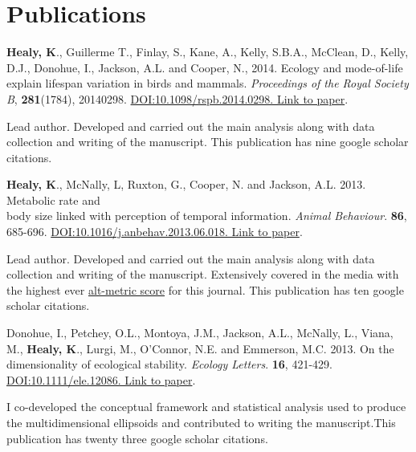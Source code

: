 \documentclass[10pt,a4paper]{article}
\begin{document}
\section{Publications}
\begin{flushleft}
\textbf{Healy, K}., Guillerme T., Finlay, S., Kane, A., Kelly, S.B.A., McClean, D., Kelly, D.J., Donohue, I., Jackson, A.L. and Cooper, N., 2014. Ecology and mode-of-life explain lifespan variation in birds and mammals. \textit{Proceedings of the Royal Society B}, \textbf{281}(1784), 20140298. \href{http://rspb.royalsocietypublishing.org/content/281/1784/20140298}{DOI:10.1098/rspb.2014.0298. Link to paper}.
\smallskip
\par{\fontsize{10.5}{10} Lead author. Developed and carried out the main analysis along with data collection and writing of the manuscript. This publication has nine google scholar citations.}

\bigskip

\textbf{Healy, K}., McNally, L, Ruxton, G., Cooper, N. and Jackson, A.L. 2013. Metabolic rate and\\
body size linked with perception of temporal information.  \textit{Animal Behaviour}. \textbf{86}, 685-696. \href{http://dx.doi.org/10.1016/j.anbehav.2013.06.018}{DOI:10.1016/j.anbehav.2013.06.018. Link to paper}.
\smallskip
\par{\fontsize{10.5}{10} Lead author. Developed and carried out the main analysis along with data collection and writing of the manuscript. Extensively covered in the media with the highest ever \href{http://www.altmetric.com/details.php?key=517059da36b98ab7d4941284da32e5f7&citation_id=1705703&embedded=true}{alt-metric score} for this journal. This publication has ten google scholar citations.} 

\bigskip

\setlength{\parindent}{0mm}Donohue, I., Petchey, O.L., Montoya, J.M., Jackson, A.L., McNally, L., Viana, M., \textbf{Healy, K}., Lurgi, M., O’Connor, N.E. and Emmerson, M.C. 2013. On the dimensionality of ecological stability. \textit{Ecology Letters}. \textbf{16}, 421-429. \href{http://onlinelibrary.wiley.com/doi/10.1111/ele.12086/abstract} {DOI:10.1111/ele.12086. Link to paper}. 
\smallskip
\par{\fontsize{10.5}{10} I co-developed the conceptual framework and statistical analysis used to produce the multidimensional ellipsoids and contributed to writing the manuscript.This publication has twenty three google scholar citations.}
\bigskip


\end{flushleft}
\end{document}
